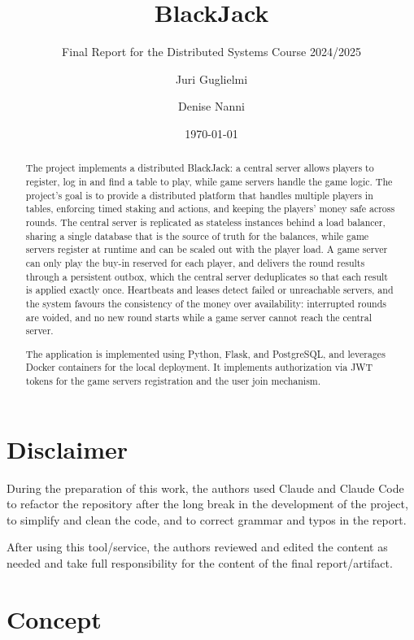 \documentclass{scrartcl}
\title{\LARGE
    BlackJack\\
}
\subtitle{Final Report for the Distributed Systems Course 2024/2025}
\author{
    Juri Guglielmi \\ \emailaddr{juri.guglielmi@studio.unibo.it}
    \and
    Denise Nanni \\ \emailaddr{denise.nanni@studio.unibo.it}
}
\date{\today}
\begin{document}
\maketitle

\begin{abstract}
The project implements a distributed BlackJack: a central server allows players to register, log in and find a table to play, while game servers handle the game logic. The project's goal is to provide a distributed platform that handles multiple players in tables, enforcing timed staking and actions, and keeping the players' money safe across rounds.
The central server is replicated as stateless instances behind a load balancer, sharing a single database that is the source of truth for the balances, while game servers register at runtime and can be scaled out with the player load.
A game server can only play the buy-in reserved for each player, and delivers the round results through a persistent outbox, which the central server deduplicates so that each result is applied exactly once.
Heartbeats and leases detect failed or unreachable servers, and the system favours the consistency of the money over availability: interrupted rounds are voided, and no new round starts while a game server cannot reach the central server.

The application is implemented using Python, Flask, and PostgreSQL, and leverages Docker containers for the local deployment.
It implements authorization via JWT tokens for the game servers registration and the user join mechanism.
\end{abstract}

\section*{Disclaimer}

During the preparation of this work, the authors used Claude and Claude Code to refactor the repository after the long break in the development of the project, to simplify and clean the code, and to correct grammar and typos in the report.

After using this tool/service, 
the authors reviewed and edited the content as needed 
and take full responsibility for the content of the final report/artifact.

\glsaddall
\printglossary[title=Glossary]
\label{glossary}

\section{Concept}\label{concept}
\end{document}

